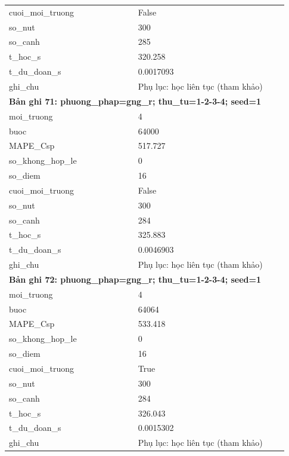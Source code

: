 \begin{longtable}{p{0.43\linewidth}p{0.50\linewidth}}
cuoi\_\allowbreak moi\_\allowbreak truong & False \\
so\_\allowbreak nut & 300 \\
so\_\allowbreak canh & 285 \\
t\_\allowbreak hoc\_\allowbreak s & 320.258 \\
t\_\allowbreak du\_\allowbreak doan\_\allowbreak s & 0.0017093 \\
ghi\_\allowbreak chu & Phụ lục: học liên tục (tham khảo) \\
\midrule
\multicolumn{2}{p{0.95\linewidth}}{\textbf{Bản ghi 71: phuong\_phap=gng\_r; thu\_tu=1-2-3-4; seed=1}} \\
moi\_\allowbreak truong & 4 \\
buoc & 64000 \\
MAPE\_\allowbreak Csp & 517.727 \\
so\_\allowbreak khong\_\allowbreak hop\_\allowbreak le & 0 \\
so\_\allowbreak diem & 16 \\
cuoi\_\allowbreak moi\_\allowbreak truong & False \\
so\_\allowbreak nut & 300 \\
so\_\allowbreak canh & 284 \\
t\_\allowbreak hoc\_\allowbreak s & 325.883 \\
t\_\allowbreak du\_\allowbreak doan\_\allowbreak s & 0.0046903 \\
ghi\_\allowbreak chu & Phụ lục: học liên tục (tham khảo) \\
\midrule
\multicolumn{2}{p{0.95\linewidth}}{\textbf{Bản ghi 72: phuong\_phap=gng\_r; thu\_tu=1-2-3-4; seed=1}} \\
moi\_\allowbreak truong & 4 \\
buoc & 64064 \\
MAPE\_\allowbreak Csp & 533.418 \\
so\_\allowbreak khong\_\allowbreak hop\_\allowbreak le & 0 \\
so\_\allowbreak diem & 16 \\
cuoi\_\allowbreak moi\_\allowbreak truong & True \\
so\_\allowbreak nut & 300 \\
so\_\allowbreak canh & 284 \\
t\_\allowbreak hoc\_\allowbreak s & 326.043 \\
t\_\allowbreak du\_\allowbreak doan\_\allowbreak s & 0.0015302 \\
ghi\_\allowbreak chu & Phụ lục: học liên tục (tham khảo) \\

\end{longtable}
